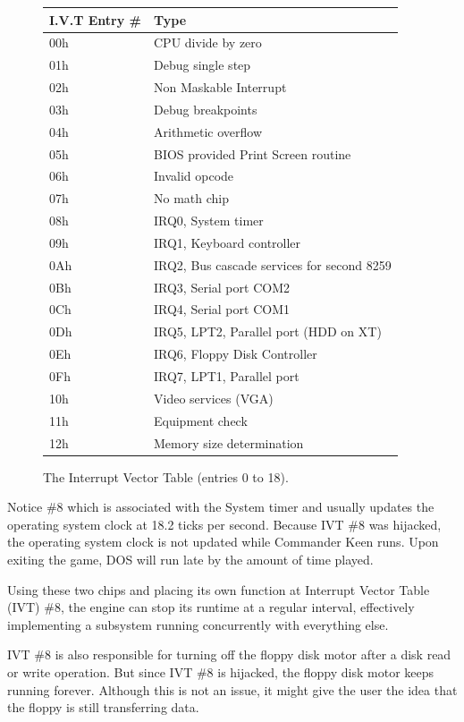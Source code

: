 \documentclass[book.tex]{subfiles}
\begin{document}
\begin{figure}[H]
	\centering
	\begin{tabularx}{\textwidth}{ l p{}  }
	  \toprule
	  \textbf{I.V.T Entry \#} & \textbf{Type} \\ \bottomrule

	  00h	&	CPU divide by zero \\
01h	&	Debug single step \\
02h	&	Non Maskable Interrupt \\
03h	&	Debug breakpoints \\
04h	&	Arithmetic overflow \\
05h	&	BIOS provided Print Screen routine \\
06h	&	Invalid opcode \\
07h	&	No math chip \\
08h & IRQ0, System timer \\
09h & IRQ1, Keyboard controller \\
0Ah & IRQ2, Bus cascade services for second 8259 \\
0Bh & IRQ3, Serial port COM2 \\ 
0Ch & IRQ4, Serial port COM1 \\
0Dh & IRQ5, LPT2, Parallel port (HDD on XT) \\
0Eh & IRQ6, Floppy Disk Controller \\
0Fh & IRQ7, LPT1, Parallel port \\
10h & Video services (VGA)\\
11h & Equipment check \\
12h & Memory size determination \\
		\bottomrule
	\end{tabularx}
	\caption{The Interrupt Vector Table (entries 0 to 18).}
\end{figure}
Notice \#8 which is associated with the System timer and usually updates the operating system clock at 18.2 ticks per second. Because IVT \#8 was hijacked, the operating system clock is not updated while Commander Keen runs. Upon exiting the game, DOS will run late by the amount of time played.\\
\par
Using these two chips and placing its own function at Interrupt Vector Table (IVT) \#8, the engine can stop its runtime at a regular interval, effectively implementing a subsystem running concurrently with everything else.\\
\par
IVT \#8 is also responsible for turning off the floppy disk motor after a disk read or write operation. But since IVT \#8 is hijacked, the floppy disk motor keeps running forever. Although this is not an issue, it might give the user the idea that the floppy is still transferring data.\\
\end{document}

